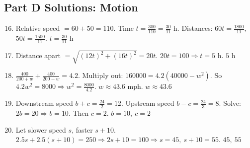 \documentclass[14pt]{extarticle}
\begin{document}
\subsection*{Part D Solutions: Motion}
\begin{enumerate}
  \setcounter{enumi}{15}
  \item Relative speed \(=60+50=110\). Time \(t=\frac{300}{110}=\frac{30}{11}\) h.  
  Distances: \(60t=\frac{1800}{11}\), \(50t=\frac{1500}{11}\). \(\boxed{t=\tfrac{30}{11}\text{ h}}\)

  \item Distance apart \(= \sqrt{(12t)^2+(16t)^2}=20t\).  
  \(20t=100 \Rightarrow t=5\) h. \(\boxed{5\text{ h}}\)

  \item \( \frac{400}{200+w}+\frac{400}{200-w}=4.2\).  
  Multiply out: \(160000=4.2(40000-w^2)\). So \(4.2w^2=8000 \Rightarrow w^2=\frac{8000}{4.2}\).  
  \(w\approx 43.6\) mph. \(\boxed{w\approx43.6}\)

  \item Downstream speed \(b+c= \frac{24}{2}=12\). Upstream speed \(b-c= \frac{24}{3}=8\).  
  Solve: \(2b=20 \Rightarrow b=10\). Then \(c=2\). \(\boxed{b=10,\ c=2}\)

  \item Let slower speed \(s\), faster \(s+10\).  
  \(2.5s+2.5(s+10)=250 \Rightarrow 2s+10=100 \Rightarrow s=45,\ s+10=55\). \(\boxed{45,\ 55}\)
\end{enumerate}
\end{document}
